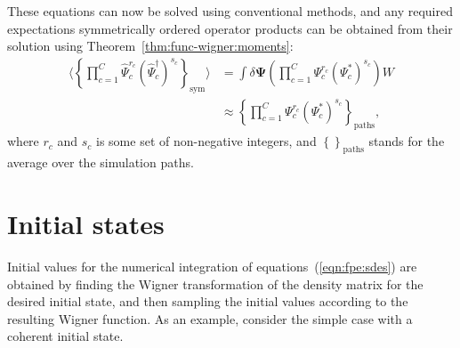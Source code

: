 \documentclass[12pt,aip,jmp,amssymb,amsmath]{revtex4-1}
\begin{document}
These equations can now be solved using conventional methods, and any required expectations symmetrically ordered operator products can be obtained from their solution using Theorem~\ref{thm:func-wigner:moments}:
\begin{equation}\begin{split}
    \langle \left\{
        \prod_{c=1}^C \hat{\Psi}_c^{r_c} (\hat{\Psi}_c^\dagger)^{s_c}
    \right\}_{\mathrm{sym}} \rangle
    & = \int \delta \boldsymbol{\Psi} \left(
            \prod_{c=1}^C \Psi_c^{r_c} (\Psi_c^*)^{s_c}
        \right) W \\
    & \approx \left\{
        \prod_{c=1}^C \Psi_c^{r_c} (\Psi_c^*)^{s_c}
    \right\}_{\mathrm{paths}},
\end{split}\end{equation}
where $r_c$ and $s_c$ is some set of non-negative integers, and $\left\{\right\}_{\mathrm{paths}}$ stands for the average over the simulation paths.



\section{Initial states}

Initial values for the numerical integration of equations~(\ref{eqn:fpe:sdes}) are obtained by finding the Wigner transformation of the density matrix for the desired initial state, and then sampling the initial values according to the resulting Wigner function.
As an example, consider the simple case with a coherent initial state.
\end{document}
